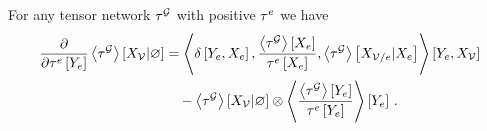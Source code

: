 \begin{lemma}
    \label{lem:difMNprob}
    For any tensor network $\tau^{\mathcal{G}}$ with positive $\tau^{e}$ we have
    \begin{align*}
        \frac{\partial }{\partial \tau^{e}\left[Y_{e}\right]} \left\langle \tau^{\mathcal{G}}\right\rangle \left[ X_{\mathcal{V}} | \varnothing \right]
        & = \left\langle 
            \delta\left[Y_{e},X_{e}\right],
            \frac{\left\langle \tau^{\mathcal{G}}\right\rangle \left[ X_{e} \right]}{\tau^{e}\left[X_{e}\right]},
            \left\langle \tau^{\mathcal{G}}\right\rangle \left[ X_{\mathcal{V}/e} | X_{e} \right] \right\rangle \left[ Y_{e},X_{\mathcal{V}} \right] \\
        & \quad -  \left\langle \tau^{\mathcal{G}}\right\rangle \left[ X_{\mathcal{V}} | \varnothing \right] \otimes \left\langle \frac{\left\langle \tau^{\mathcal{G}}\right\rangle \left[ Y_{e} \right]}{\tau^{e}\left[Y_{e}\right]}
        \right\rangle \left[ Y_{e} \right] \, .
    \end{align*}
\end{lemma}
